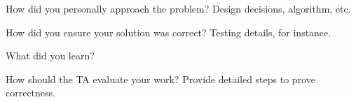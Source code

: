 \documentclass{article}
\newenvironment{question}[2][Question]{\begin{trivlist}
\item[\hskip \labelsep {\bfseries #1}\hskip \labelsep {\bfseries #2.}]}{\end{trivlist}}
\begin{document}
\begin{question}{2}
How did you personally approach the problem? Design decisions, algorithm, etc.
\end{question}




\vspace{0.25in} %

\begin{question}{3}
How did you ensure your solution was correct? Testing details, for instance.
\end{question}



\vspace{0.25in}
\begin{question}{4}
What did you learn?
\end{question}




\vspace{0.25in}
\begin{question}{5}
How should the TA evaluate your work? Provide detailed steps to prove correctness.
\end{question}



\end{document}
